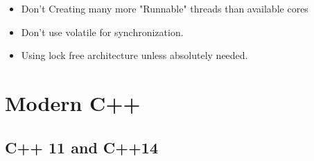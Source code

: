 \documentclass[a4paper,11pt,twoside]{book}
\begin{document}
\begin{itemize}
    \item Don't Creating many more "Runnable" threads than available cores

    \item Don't use volatile for synchronization.

    \item Using lock free architecture unless absolutely needed. 
\end{itemize}

	

	
	

\chapter{Modern C++}
\section{C++ 11 and C++14}
\end{document}
